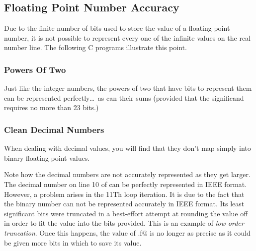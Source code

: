 \subsection{Floating Point Number Accuracy}
Due to the finite number of bits used to store the value of a floating point
number, it is not possible to represent every one of the infinite values
on the real number line.  The following C programs illustrate this point.

\subsubsection{Powers Of Two}
Just like the integer numbers, the powers of two that have bits to represent 
them can be represented perfectly\ldots\ as can their sums (provided that the
significand requires no more than 23 bits.)


\subsubsection{Clean Decimal Numbers}
When dealing with decimal values, you will find that they don't map simply
into binary floating point values.

Note how the decimal numbers are not accurately represented as they get larger.
The decimal number on line 10 of 
can be perfectly represented in IEEE format.  However, a problem arises in 
the 11Th loop iteration.  It is due to the fact that the
binary number can not be represented accurately in IEEE format.  Its least
significant bits were truncated in a best-effort attempt at rounding the value
off in order to fit the value into the bits provided.  This is an example of
{\em low order truncation}.  Once this happens, the value of \verb@x.f@ is
no longer as precise as it could be given more bits in which to save its value.


